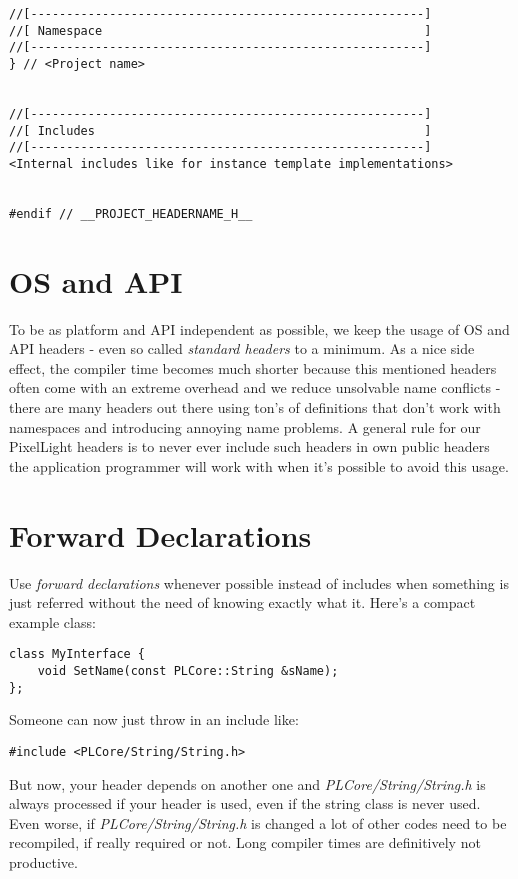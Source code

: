 \begin{lstlisting}[caption=Complete header layout]
//[-------------------------------------------------------]
//[ Namespace                                             ]
//[-------------------------------------------------------]
} // <Project name>


//[-------------------------------------------------------]
//[ Includes                                              ]
//[-------------------------------------------------------]
<Internal includes like for instance template implementations>


#endif // __PROJECT_HEADERNAME_H__
\end{lstlisting}




\section{\ac{OS} and \ac{API}}
To be as platform and \ac{API} independent as possible, we keep the usage of \ac{OS} and \ac{API} headers - even so called \emph{standard headers} to a minimum. As a nice side effect, the compiler time becomes much shorter because this mentioned headers often come with an extreme overhead and we reduce unsolvable name conflicts - there are many headers out there using ton's of definitions that don't work with namespaces and introducing annoying name problems. A general rule for our PixelLight headers is to never ever include such headers in own public headers the application programmer will work with when it's possible to avoid this usage.




\section{Forward Declarations}
Use \emph{forward declarations} whenever possible instead of includes when something is just referred without the need of knowing exactly what it. Here's a compact example class:

\begin{lstlisting}[caption=Using forward declaration]
class MyInterface {
	void SetName(const PLCore::String &sName);
};
\end{lstlisting}

Someone can now just throw in an include like:

\begin{lstlisting}[caption=Include]
#include <PLCore/String/String.h>
\end{lstlisting}

But now, your header depends on another one and \emph{PLCore/String/String.h} is always processed if your header is used, even if the string class is never used. Even worse, if \emph{PLCore/String/String.h} is changed a lot of other codes need to be recompiled, if really required or not. Long compiler times are definitively not productive.

